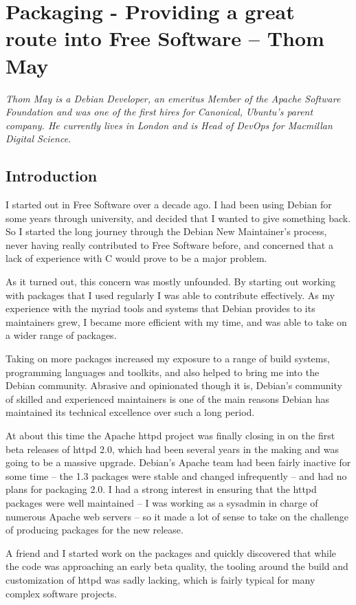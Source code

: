 \chapter{Packaging - Providing a great route into Free Software -- Thom May}

\textit{Thom May is a Debian Developer, an emeritus Member of the Apache
Software Foundation and was one of the first hires for Canonical, Ubuntu's
parent company. He currently lives in London and is Head of DevOps for Macmillan
Digital Science.}

\section*{Introduction}
I started out in Free Software over a decade ago. I had been using Debian for
some years through university, and decided that I wanted to give something back.
So I started the long journey through the Debian New Maintainer's process, never
having really contributed to Free Software before, and concerned that a lack of
experience with C would prove to be a major problem.

As it turned out, this concern was mostly unfounded. By starting out working
with packages that I used regularly I was able to contribute effectively. As my
experience with the myriad tools and systems that Debian provides to its
maintainers grew, I became more efficient with my time, and was able to take on
a wider range of packages. 

Taking on more packages increased my exposure to a range of build systems,
programming languages and toolkits, and also helped to bring me into the Debian
community. Abrasive and opinionated though it is, Debian's community of skilled
and experienced maintainers is one of the main reasons Debian has maintained its
technical excellence over such a long period.

At about this time the Apache httpd project was finally closing in on the first
beta releases of httpd 2.0, which had been several years in the making and was
going to be a massive upgrade. Debian's Apache team had been fairly inactive for
some time -- the 1.3 packages were stable and changed infrequently -- and had no
plans for packaging 2.0. 
I had a strong interest in ensuring that the httpd packages were well maintained
-- I was working as a sysadmin in charge of numerous Apache web servers -- so it
made a lot of sense to take on the challenge of producing packages for the new
release. 

A friend and I started work on the packages and quickly discovered that while
the code was approaching an early beta quality, the tooling around the build and
customization of httpd was sadly lacking, which is fairly typical for many
complex software projects. 

